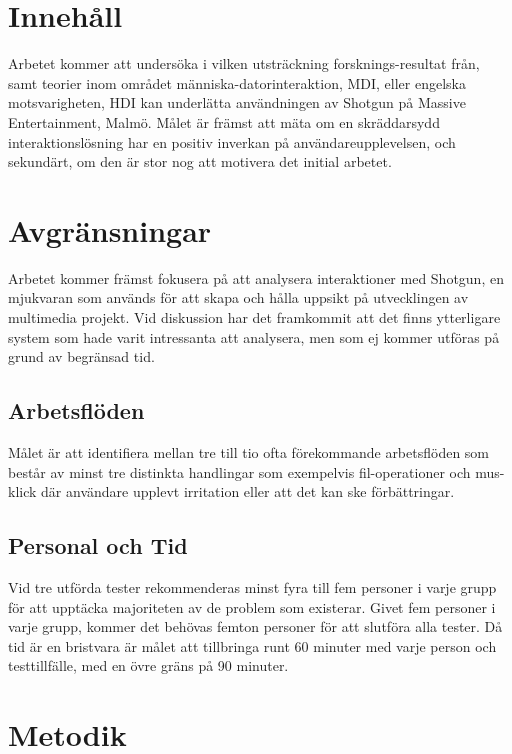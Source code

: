 \documentclass{article}
\begin{document}
\section*{Innehåll}
  Arbetet kommer att undersöka i vilken utsträckning forsknings-resultat
  från, samt teorier inom området människa-datorinteraktion, MDI\cite{c_mdi},
  eller engelska motsvarigheten, HDI\cite{c_hci} kan underlätta användningen av
  Shotgun\cite{c_shotgun} på Massive Entertainment\cite{c_massive}, Malmö.
  Målet är främst att mäta om en skräddarsydd interaktionslösning har en
  positiv inverkan på användareupplevelsen, och sekundärt, om den är stor nog
  att motivera det initial arbetet.

\section*{Avgränsningar}

  Arbetet kommer främst fokusera på att analysera interaktioner med
  Shotgun\cite{c_shotgun}, en mjukvaran som används för att skapa och hålla
  uppsikt på utvecklingen av multimedia projekt. Vid diskussion har det framkommit
  att det finns ytterligare system som hade varit intressanta att analysera,
  men som ej kommer utföras på grund av begränsad tid.

  \subsection*{Arbetsflöden}

    Målet är att identifiera mellan tre till tio ofta förekommande arbetsflöden
    som består av minst tre distinkta handlingar som exempelvis fil-operationer
    och mus-klick där användare upplevt irritation eller att det kan ske
    förbättringar.

  \subsection*{Personal och Tid}

    Vid tre utförda tester rekommenderas minst fyra till fem personer i varje
    grupp för att upptäcka majoriteten av de problem som
    existerar\cite[p.126]{c_handbook_usability}. Givet fem personer i varje
    grupp, kommer det behövas femton personer för att slutföra alla tester.
    Då tid är en bristvara är målet att tillbringa runt 60 minuter med varje
    person och testtillfälle, med en övre gräns på 90 minuter.

\section*{Metodik}
\end{document}
